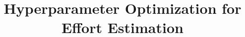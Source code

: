 \documentclass[10pt,conference]{IEEEtran}
\begin{document}
\pagestyle{plain}
\thispagestyle{empty}
\title{Hyperparameter Optimization  for    Effort Estimation}

\maketitle


\end{document}
